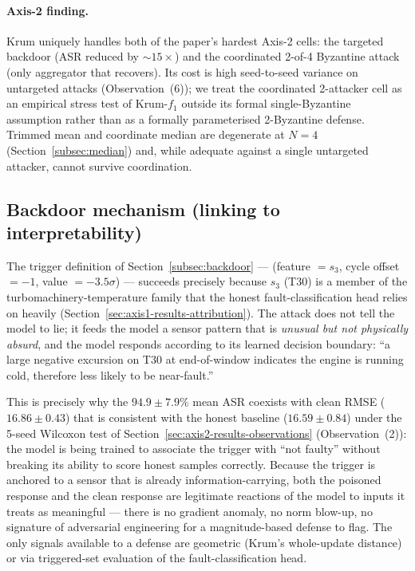 \documentclass[preprint,12pt,authoryear]{elsarticle}
\begin{document}
\paragraph{Axis-2 finding.}
Krum uniquely handles both of the paper's hardest Axis-2 cells: the
targeted backdoor (ASR reduced by $\sim 15\times$) and the
coordinated 2-of-4 Byzantine attack (only aggregator that recovers).
Its cost is high seed-to-seed variance on untargeted attacks
(Observation~(6)); we treat the coordinated 2-attacker cell as an
empirical stress test of Krum-$f_1$ outside its formal
single-Byzantine assumption rather than as a formally parameterised
2-Byzantine defense. Trimmed mean and coordinate median are
degenerate at $N = 4$ (Section~\ref{subsec:median}) and, while
adequate against a single untargeted attacker, cannot survive
coordination.

\subsection{Backdoor mechanism (linking to interpretability)}
\label{sec:axis2-results-mechanism}

The trigger definition of Section~\ref{subsec:backdoor} ---
(feature $= s_3$, cycle offset $= -1$, value $= -3.5\sigma$) ---
succeeds precisely because $s_3$ (T30) is a member of the
turbomachinery-temperature family that the honest
fault-classification head relies on heavily
(Section~\ref{sec:axis1-results-attribution}). The attack does not
tell the model to lie; it feeds the model a sensor pattern that is
\emph{unusual but not physically absurd}, and the model responds
according to its learned decision boundary: ``a large negative
excursion on T30 at end-of-window indicates the engine is running
cold, therefore less likely to be near-fault.''

This is precisely why the $94.9 \pm 7.9\%$ mean ASR coexists with
clean RMSE ($16.86 \pm 0.43$) that is consistent with the honest
baseline ($16.59 \pm 0.84$) under the 5-seed Wilcoxon test of
Section~\ref{sec:axis2-results-observations} (Observation~(2)):
the model is being trained to associate the trigger with ``not
faulty'' without breaking its ability to score honest samples
correctly. Because the trigger
is anchored to a sensor that is already information-carrying, both
the poisoned response and the clean response are legitimate
reactions of the model to inputs it treats as meaningful --- there
is no gradient anomaly, no norm blow-up, no signature of adversarial
engineering for a magnitude-based defense to flag. The only signals
available to a defense are geometric (Krum's whole-update distance)
or via triggered-set evaluation of the fault-classification head.
\end{document}
